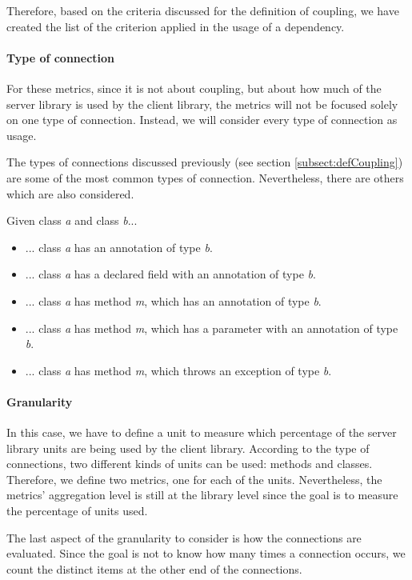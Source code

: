 Therefore, based on the criteria discussed for the definition of coupling, we have created the list of the criterion applied in the usage of a dependency.

\paragraph{Type of connection}
For these metrics, since it is not about coupling, but about how much of the server library is used by the client library, the metrics will not be focused solely on one type of connection. Instead, we will consider every type of connection as usage.

The types of connections discussed previously (see section \ref{subsect:defCoupling}) are some of the most common types of connection. Nevertheless, there are others which are also considered.

Given class \textit{a} and class \textit{b}...

\begin{itemize}
  \item ... class \textit{a} has an annotation of type \textit{b}.
  \item ... class \textit{a} has a declared field with an annotation of type \textit{b}.
  \item ... class \textit{a} has method \textit{m}, which has an annotation of type \textit{b}.
  \item ... class \textit{a} has method \textit{m}, which has a parameter with an annotation of type \textit{b}.
  \item ... class \textit{a} has method \textit{m}, which throws an exception of type \textit{b}.
\end{itemize}

\paragraph{Granularity}
In this case, we have to define a unit to measure which percentage of the server library units are being used by the client library. According to the type of connections, two different kinds of units can be used: methods and classes. Therefore, we define two metrics, one for each of the units. Nevertheless, the metrics' aggregation level is still at the library level since the goal is to measure the percentage of units used.

The last aspect of the granularity to consider is how the connections are evaluated. Since the goal is not to know how many times a connection occurs, we count the distinct items at the other end of the connections.

